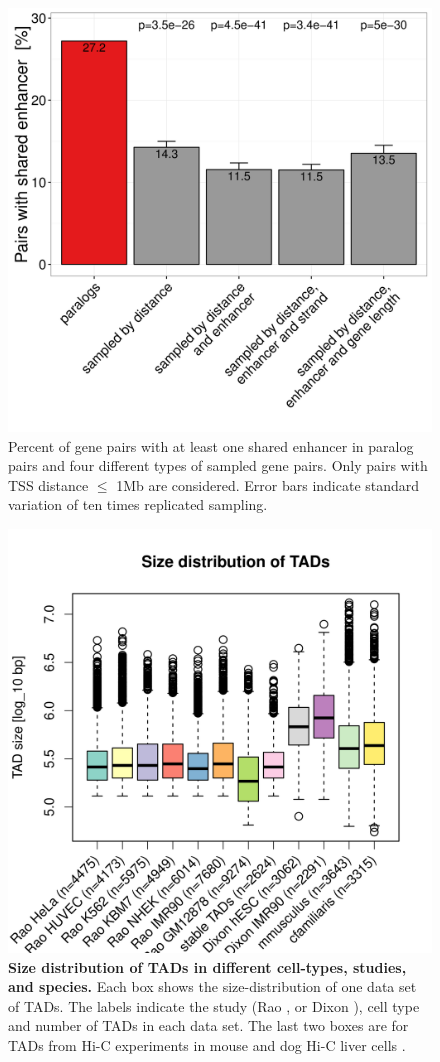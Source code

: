 \documentclass[a4paper,twoside=true,openright,parskip=full,chapterprefix=true,11pt,headings=normal,bibliography=totoc,listof=totoc,titlepage=on,captions=tableabove,draft=false]{scrreprt}
\theoremstyle{definition}
\theoremstyle{definition}
\theoremstyle{definition}
\theoremstyle{remark}
\begin{document}
\begin{figure}

{\centering \includegraphics[width=0.5\linewidth]{figures/paralog/SI/figS7} 

}

\caption{Percent of gene pairs with at least one shared
enhancer in paralog pairs and four different types of sampled gene
pairs. Only pairs with TSS distance \(\leq\) 1Mb are considered. Error
bars indicate standard variation of ten times replicated sampling.}\label{fig:ehBySampType}
\end{figure}






\begin{figure}

{\centering \includegraphics[width=0.6\linewidth]{figures/paralog/SI/figS8} 

}

\caption{\textbf{Size distribution of TADs in different cell-types,
studies, and species.} Each box shows the size-distribution of one data
set of TADs. The labels indicate the study (Rao \citep{Rao2014}, or
Dixon \citep{Dixon2012}), cell type and number of TADs in each data set.
The last two boxes are for TADs from Hi-C experiments in mouse and dog
Hi-C liver cells \citep{VietriRudan2015}.}\label{fig:TADsize}
\end{figure}
\end{document}
